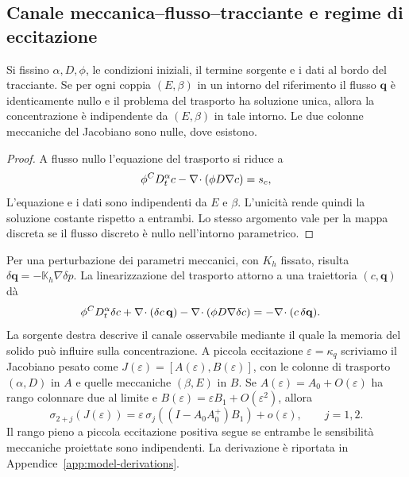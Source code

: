 \subsection{Canale meccanica--flusso--tracciante e regime di eccitazione}

\begin{proposition}\label{prop:pv-zero-flow}
Si fissino $\alpha,D,\phi$, le condizioni iniziali, il termine sorgente e i dati al bordo del tracciante. Se per ogni coppia $(E,\beta)$ in un intorno del riferimento il flusso $\mathbf q$ è identicamente nullo e il problema del trasporto ha soluzione unica, allora la concentrazione è indipendente da $(E,\beta)$ in tale intorno. Le due colonne meccaniche del Jacobiano sono nulle, dove esistono.
\end{proposition}
\begin{proof}
A flusso nullo l'equazione del trasporto si riduce a
\begin{equation}
 \phi{}^{C}D_t^{\alpha}c-\nabla\!\cdot(\phi D\nabla c)=s_c ,
 \label{eq:zero-flow-tracer}
\end{equation}
L'equazione e i dati sono indipendenti da $E$ e $\beta$. L'unicità rende quindi la soluzione costante rispetto a entrambi. Lo stesso argomento vale per la mappa discreta se il flusso discreto è nullo nell'intorno parametrico.
\end{proof}

Per una perturbazione dei parametri meccanici, con $K_h$ fissato, risulta $\delta\mathbf q=-\mathbb K_h\nabla\delta p$. La linearizzazione del trasporto attorno a una traiettoria $(c,\mathbf q)$ dà
\begin{equation}
\begin{aligned}
 \phi{}^{C}D_t^{\alpha}\delta c+\nabla\!\cdot(\delta c\,\mathbf q)
  -\nabla\!\cdot(\phi D\nabla\delta c)
  &=-\nabla\!\cdot(c\,\delta\mathbf q).
\end{aligned}
\label{eq:mech-tracer-variation}
\end{equation}
La sorgente destra descrive il canale osservabile mediante il quale la memoria del solido può influire sulla concentrazione. A piccola eccitazione $\varepsilon=\kappa_q$ scriviamo il Jacobiano pesato come $J(\varepsilon)=[A(\varepsilon),B(\varepsilon)]$, con le colonne di trasporto $(\alpha,D)$ in $A$ e quelle meccaniche $(\beta,E)$ in $B$. Se $A(\varepsilon)=A_0+O(\varepsilon)$ ha rango colonnare due al limite e $B(\varepsilon)=\varepsilon B_1+O(\varepsilon^2)$, allora
\begin{equation}
 \sigma_{2+j}(J(\varepsilon))
 =\varepsilon\,\sigma_j((I-A_0A_0^+)B_1)+o(\varepsilon),
 \qquad j=1,2 .
 \label{eq:weak-flow-singular}
\end{equation}
Il rango pieno a piccola eccitazione positiva segue se entrambe le sensibilità meccaniche proiettate sono indipendenti. La derivazione è riportata in Appendice~\ref{app:model-derivations}.

